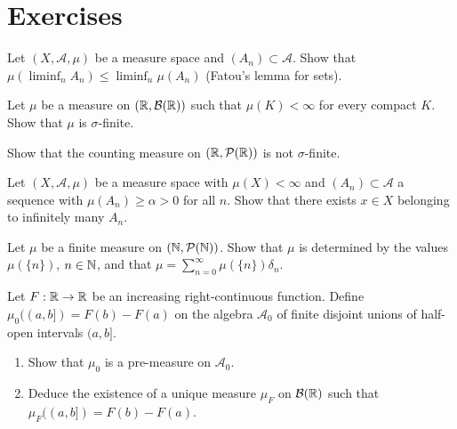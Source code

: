 \section{Exercises}

\begin{exercise}
Let $(X, \mathcal{A}, \mu)$ be a measure space and $(A_n) \subset \mathcal{A}$.
Show that
$\mu(\liminf_n A_n) \leq \liminf_n \mu(A_n)$
(Fatou's lemma for sets).
\end{exercise}

\begin{exercise}
Let $\mu$ be a measure on $(\mathbb{R}, \mathcal{B}(\mathbb{R}))$ such that $\mu(K) < \infty$ for
every compact $K$. Show that $\mu$ is $\sigma$-finite.
\end{exercise}

\begin{exercise}
Show that the counting measure on $(\mathbb{R}, \mathcal{P}(\mathbb{R}))$ is not $\sigma$-finite.
\end{exercise}

\begin{exercise}
Let $(X, \mathcal{A}, \mu)$ be a measure space with $\mu(X) < \infty$ and
$(A_n) \subset \mathcal{A}$ a sequence with $\mu(A_n) \geq \alpha > 0$ for all $n$.
Show that there exists $x \in X$ belonging to infinitely many $A_n$.
\end{exercise}

\begin{exercise}
Let $\mu$ be a finite measure on $(\mathbb{N}, \mathcal{P}(\mathbb{N}))$. Show that $\mu$ is
determined by the values $\mu(\{n\})$, $n \in \mathbb{N}$, and that
$\mu = \sum_{n=0}^{\infty} \mu(\{n\}) \delta_n$.
\end{exercise}

\begin{exercise}
Let $F : \mathbb{R} \to \mathbb{R}$ be an increasing right-continuous function. Define
$\mu_0((a, b]) = F(b) - F(a)$ on the algebra $\mathcal{A}_0$ of finite disjoint
unions of half-open intervals $(a, b]$.
\begin{enumerate}
    \item Show that $\mu_0$ is a pre-measure on $\mathcal{A}_0$.
    \item Deduce the existence of a unique measure $\mu_F$ on $\mathcal{B}(\mathbb{R})$
    such that $\mu_F((a, b]) = F(b) - F(a)$.
\end{enumerate}
\end{exercise}
